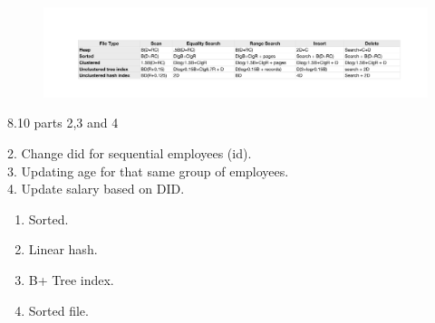 \begin{problem}{8.6}
  \begin{solution}
    \begin{figure}[H]
      \centering
      \includegraphics[scale=0.65]{problem_8_6.pdf}
    \end{figure}
  \end{solution}
\end{problem}

\begin{problem}{8.10 parts 2,3 and 4}
  \begin{solution}
    2. Change did for sequential employees (id).\\
    3. Updating age for that same group of employees.\\
    4. Update salary based on DID.
  \end{solution}
\end{problem}

\begin{problem}{12.2}
  \begin{solution}
    \begin{enumerate}
      \item Sorted. \\
      \item Linear hash.\\
      \item B+ Tree index.\\
      \item Sorted file.
    \end{enumerate}
  \end{solution}
\end{problem}

